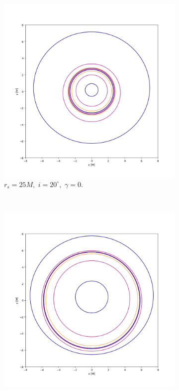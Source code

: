 \begin{figure}[!htb]
	\centering
	\begin{subfigure}{6cm}
		\hspace{-1.2cm}
		\includegraphics[scale = 0.32]{WH_20_deg_r6_gamma_0.png}
		\caption{$r_s = 25M,\,\, i = 20^\circ,\,\,\gamma = 0$.}
	\end{subfigure}\,\,\,
	\begin{subfigure}{6cm}
		\hspace{-0.7cm}
		\includegraphics[scale = 0.32]{WH_20_deg_r6_gamma_3.png}

\end{subfigure}
\end{figure}
